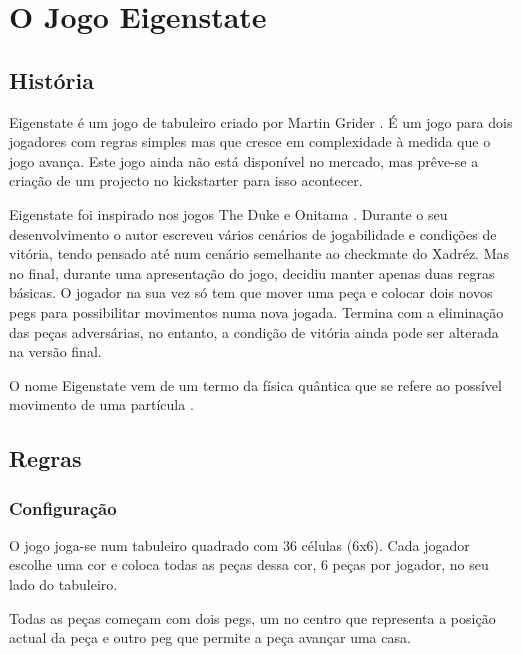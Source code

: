 \documentclass[paper=a4, fontsize=11pt]{scrartcl} %
\numberwithin{equation}{section} %
\numberwithin{figure}{section} %
\numberwithin{table}{section} %
\begin{document}
\section{O Jogo Eigenstate} \label{ojogo}


\subsection{História}

Eigenstate é um jogo de tabuleiro criado por Martin Grider \cite{GameGeek:2018}. É um jogo para dois jogadores com regras simples mas que cresce em complexidade à medida que o jogo avança. Este jogo ainda não está disponível no mercado, mas prêve-se a criação de um projecto no kickstarter para isso acontecer.

Eigenstate foi inspirado nos jogos The Duke \cite{TheDuke:2013} e Onitama \cite{Onitama:2014}. Durante o seu desenvolvimento o autor escreveu vários cenários de jogabilidade e condições de vitória, tendo pensado até num cenário semelhante ao checkmate do Xadréz. Mas no final, durante uma apresentação do jogo, decidiu manter apenas duas regras básicas. O jogador na sua vez só tem que mover uma peça e colocar dois novos pegs para possibilitar movimentos numa nova jogada. Termina com a eliminação das peças adversárias, no entanto, a condição de vitória ainda pode ser alterada na versão final.

O nome Eigenstate vem de um termo da física quântica que se refere ao possível movimento de uma partícula \cite{Chesstris:2018}.


\subsection{Regras}

\subsubsection{Configuração}

O jogo joga-se num tabuleiro quadrado com 36 células (6x6). Cada jogador escolhe uma cor e coloca todas as peças dessa cor, 6 peças por jogador, no seu lado do tabuleiro.

Todas as peças começam com dois pegs, um no centro que representa a posição actual da peça e outro peg que permite a peça avançar uma casa.
\end{document}
